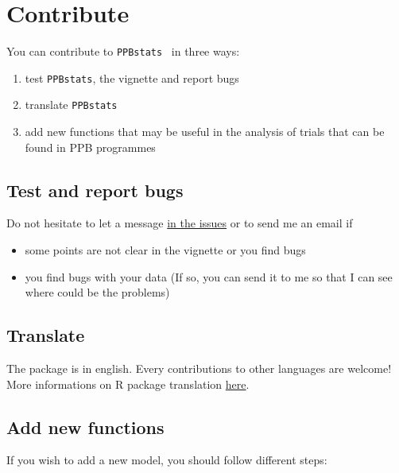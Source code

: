 \documentclass{book}\usepackage[]{graphicx}\usepackage[]{color}
\newcommand{\pack}{\texttt{PPBstats}}
\begin{document}
\chapter{Contribute}
\label{contribute}

You can contribute to \pack~ in three ways:

\begin{enumerate}
\item test \pack, the vignette and report bugs
\item translate \pack
\item add new functions that may be useful in the analysis of trials that can be found in PPB programmes
\end{enumerate}

\section{Test and report bugs}

Do not hesitate to let a message \href{https://github.com/priviere/PPBstats/issues}{in the issues} or to send me an email if
\begin{itemize}
\item some points are not clear in the vignette or you find bugs
\item you find bugs with your data (If so, you can send it to me so that I can see where could be the problems)
\end{itemize}


\section{Translate}

The package is in english. 
Every contributions to other languages are welcome!
More informations on R package translation \href{http://developer.r-project.org/Translations30.html}{here}.

\section{Add new functions}

If you wish to add a new model, you should follow different steps:
\end{document}
